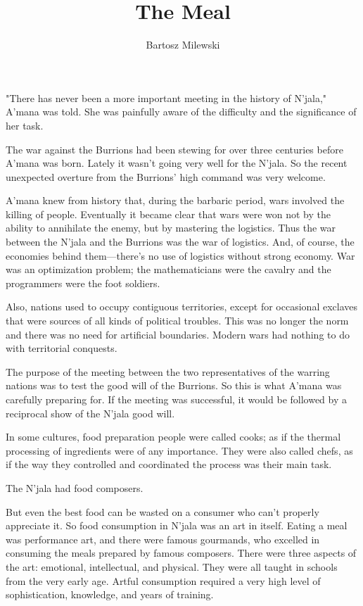 \documentclass[12pt]{book}
\author{Bartosz Milewski}
\title{The Meal}
\date{}
\begin{document}
\maketitle{}

"There has never been a more important meeting in the history of N'jala," A'mana was told. She was painfully aware of the difficulty and the significance of her task. 

The war against the Burrions had been stewing for over three centuries before A'mana was born. Lately it wasn't going very well for the N'jala. So the recent unexpected overture from the Burrions' high command was very welcome. 

A'mana knew from history that, during the barbaric period, wars involved the killing of people. Eventually it became clear that wars were won not by the ability to annihilate the enemy, but by mastering the logistics. Thus the war between the N'jala and the Burrions was the war of logistics. And, of course, the economies behind them---there's no use of logistics without strong economy. War was an optimization problem; the mathematicians were the cavalry and the programmers were the foot soldiers. 

Also, nations used to occupy contiguous territories, except for occasional exclaves that were sources of all kinds of political troubles. This was no longer the norm and there was no need for artificial boundaries. Modern wars had nothing to do with territorial conquests.

The purpose of the meeting between the two representatives of the warring nations was to test the good will of the Burrions. So this is what A'mana was carefully preparing for. If the meeting was successful, it would be followed by a reciprocal show of the N'jala good will. 

In some cultures, food preparation people were called cooks; as if the thermal processing of ingredients were of any importance. They were also called chefs, as if the way they controlled and coordinated the process was their main task. 

The N'jala had food composers. 

But even the best food can be wasted on a consumer who can't properly appreciate it. So food consumption in N'jala was an art in itself. Eating a meal was performance art, and there were famous gourmands, who excelled in consuming the meals prepared by famous composers. There were three aspects of the art: emotional, intellectual, and physical. They were all taught in schools from the very early age. Artful consumption required a very high level of sophistication, knowledge, and years of training. 
\end{document}
